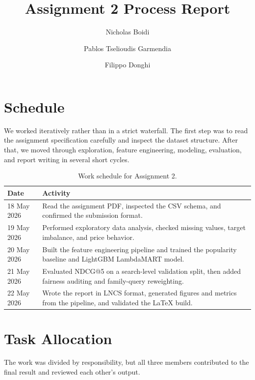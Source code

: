 \documentclass[runningheads]{llncs}
\begin{document}
\title{Assignment 2 Process Report}

\author{Nicholas Boidi \and Pablos Tselioudis Garmendia \and Filippo Donghi}



\maketitle

\section{Schedule}
We worked iteratively rather than in a strict waterfall. The first step was to read the assignment specification carefully and inspect the dataset structure. After that, we moved through exploration, feature engineering, modeling, evaluation, and report writing in several short cycles.

\begin{table}[t]
\centering
\caption{Work schedule for Assignment 2.}
\begin{tabular}{p{2.2cm}p{8.9cm}}
\toprule
Date & Activity \\
\midrule
18 May 2026 & Read the assignment PDF, inspected the CSV schema, and confirmed the submission format. \\
19 May 2026 & Performed exploratory data analysis, checked missing values, target imbalance, and price behavior. \\
20 May 2026 & Built the feature engineering pipeline and trained the popularity baseline and LightGBM LambdaMART model. \\
21 May 2026 & Evaluated NDCG@5 on a search-level validation split, then added fairness auditing and family-query reweighting. \\
22 May 2026 & Wrote the report in LNCS format, generated figures and metrics from the pipeline, and validated the LaTeX build. \\
\bottomrule
\end{tabular}
\end{table}

\section{Task Allocation}
The work was divided by responsibility, but all three members contributed to the final result and reviewed each other's output.
\end{document}
